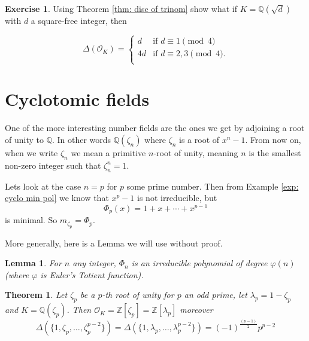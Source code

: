 \documentclass[11pt,a4paper]{report}
\theoremstyle{plain}
\newtheorem{theorem}[subsection]{Theorem}
\newtheorem{lemma}[subsection]{Lemma}
\theoremstyle{definition}
\theoremstyle{definition}
\newtheorem{question}[subsection]{Exercise}
\newcommand{\ZZ}{\mathbb{Z}}
\def\QQ{\mathbb{Q}}
\def \lam {\lambda}
\def \OO {\mathcal{O}}
\begin{document}
	\begin{question}\label{ques: disc of quad}
		Using Theorem \ref{thm: disc of trinom} show what if $K=\QQ(\sqrt{d})$ with $d$ a square-free integer, then 
		
		\[	\Delta(\OO_K)=
		\begin{cases} 
			d  & \text{if } d \equiv 1 \pmod 4 \\
			4d & \text{if }  d \equiv  2,3 \pmod 4. \\
		\end{cases}
		\]
		
		
	\end{question}
	
	\section{Cyclotomic fields}
	
	One of the more interesting number fields are the ones we get by adjoining a root of unity to $\QQ$. In other words $\QQ(\zeta_n)$ where $\zeta_n$ is a root of $x^n-1$. From now on, when we write $\zeta_n$ we mean a primitive $n$-root of unity, meaning $n$ is the smallest non-zero integer such that $\zeta_n^n=1$.
	
	Lets look at the case $n=p$ for $p$ some prime number. Then from Example \ref{exp: cyclo min pol} we know that $x^p-1$ is not irreducible, but \[\Phi_p(x)=1+x+\cdots+x^{p-1}\] is minimal. So $m_{\zeta_p}=\Phi_p$.
	
	
	More generally, here is a Lemma we will use without proof.
	\begin{lemma}\label{lem: cyclo poly}
		For $n$ any integer, $\Phi_n$ is an irreducible polynomial of degree $\varphi(n)$ (where $\varphi$ is Euler's Totient function).
	\end{lemma}
	
	
	
	
	\begin{theorem}\label{thm: ring of ints of cyclo}
		Let $\zeta_p$ be a $p$-th root of unity for $p$ an odd prime, let $\lam_p=1-\zeta_p$ and $K=\QQ(\zeta_p)$. Then $\OO_K=\ZZ[\zeta_p]=\ZZ[\lam_p]$ moreover \[\Delta(\{1,\zeta_p,\dots,\zeta_p^{p-2}\})=\Delta(\{1,\lam_p,\dots,\lam_p^{p-2}\})=(-1)^{\frac{(p-1)}{2}}p^{p-2}\]
	\end{theorem}
	
\end{document}
